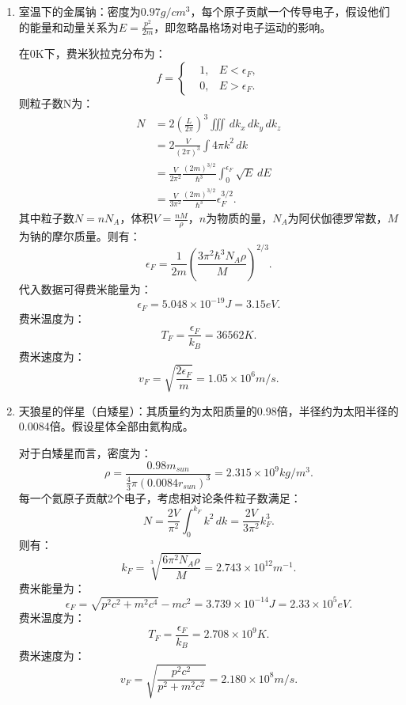 \documentclass[reqno,a4paper,12pt]{amsart}
\begin{document}
\begin{enumerate}
	\item 室温下的金属钠：密度为$0.97g/cm^3$，每个原子贡献一个传导电子，假设他们的能量和动量关系为$E = \frac{p^2}{2m}$，即忽略晶格场对电子运动的影响。
	\begin{tcolorbox}[breakable, colback = black!5!white, colframe = black]
	在0K下，费米狄拉克分布为：
	\[
		f = \left\{ \begin{aligned}
			&1, & E<\epsilon_F, \\
			&0, & E>\epsilon_F.
		\end{aligned}\right.
	\]
	则粒子数N为：
	\begin{align*}
		N &= 2\left( \frac{L}{2\pi} \right)^3 \iiint \,dk_x\,dk_y\,dk_z \\
		&= 2 \frac{V}{(2\pi)^3} \int 4\pi k^2\,dk \\
		&= \frac{V}{2\pi^2} \frac{(2m)^{3/2}}{\hbar^3} \int_0^{\epsilon_F} \sqrt{E}\,dE \\
		&= \frac{V}{3\pi^2} \frac{(2m)^{3/2}}{\hbar^3}\epsilon_F^{3/2}.
	\end{align*}
	其中粒子数$N = nN_A$，体积$V = \frac{nM}{\rho}$，$n$为物质的量，$N_A$为阿伏伽德罗常数，$M$为钠的摩尔质量。则有：
	\[
		\epsilon_F = \frac{1}{2m} \left( \frac{3\pi^2\hbar^3 N_A\rho}{M} \right)^{2/3}.
	\]
	代入数据可得费米能量为：
	\[
		\epsilon_F = 5.048\times 10^{-19} J = 3.15 eV.
	\]
	费米温度为：
	\[
		T_F = \frac{\epsilon_F}{k_B} = 36562K.
	\]
	费米速度为：
	\[
		v_F = \sqrt{\frac{2\epsilon_F}{m}} = 1.05\times 10^{6}m/s.
	\]
	\end{tcolorbox}
	
	\item 天狼星的伴星（白矮星）：其质量约为太阳质量的0.98倍，半径约为太阳半径的0.0084倍。假设星体全部由氦构成。
	\begin{tcolorbox}[breakable, colback = black!5!white, colframe = black]
	对于白矮星而言，密度为：
	\[
		\rho = \frac{0.98m_{sun}}{\frac{4}{3}\pi (0.0084r_{sun})^3} = 2.315\times 10^{9} kg/m^3.
	\]
	每一个氦原子贡献2个电子，考虑相对论条件粒子数满足：
	\[
		N = \frac{2V}{\pi^2} \int_0^{k_F} k^2\,dk = \frac{2V}{3\pi^2}k_F^3.
	\]
	则有：
	\[
		k_F = \sqrt[3]{\frac{6\pi^2N_A\rho}{M}} = 2.743\times 10^{12} m^{-1}.
	\]
	费米能量为：
	\[
		\epsilon_F = \sqrt{p^2c^2+m^2c^4} - mc^2 = 3.739\times 10^{-14}J = 2.33 \times 10^5 eV.
	\]
	费米温度为：
	\[
		T_F = \frac{\epsilon_F}{k_B} = 2.708\times 10^{9}K.
	\]
	费米速度为：
	\[
		v_F = \sqrt{\frac{p^2c^2}{p^2+m^2c^2}} = 2.180\times 10^{8}m/s.
	\]
	\end{tcolorbox}
\end{enumerate}
\end{document}
